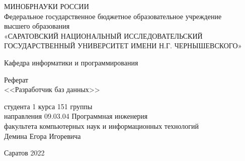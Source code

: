 \thispagestyle{empty}
    \begin{center}
      МИНОБРНАУКИ РОССИИ  \\
      Федеральное государственное бюджетное образовательное учреждение \\
      высшего образования\\
      «САРАТОВСКИЙ НАЦИОНАЛЬНЫЙ ИССЛЕДОВАТЕЛЬСКИЙ ГОСУДАРСТВЕННЫЙ УНИВЕРСИТЕТ ИМЕНИ Н.Г. ЧЕРНЫШЕВСКОГО»
      \vspace*{42pt}
    \end{center}
    \begin{flushright}
      Кафедра информатики и программирования
    \end{flushright}
      \vspace*{42pt}

      \begin{center}
        Реферат\\
       <<Разработчик баз данных>>\\
      \end{center}
          
  \begin{flushleft}
    студента 1 курса 151 группы\\
направления 09.03.04 Программная инженерия\\
факультета компьютерных наук и информационных технологий\\
Демина Егора Игоревича \\

  \end{flushleft}
  \vspace*{336pt}

  \centering
  Саратов 2022

  \newpage
  \thispagestyle{empty}
  
